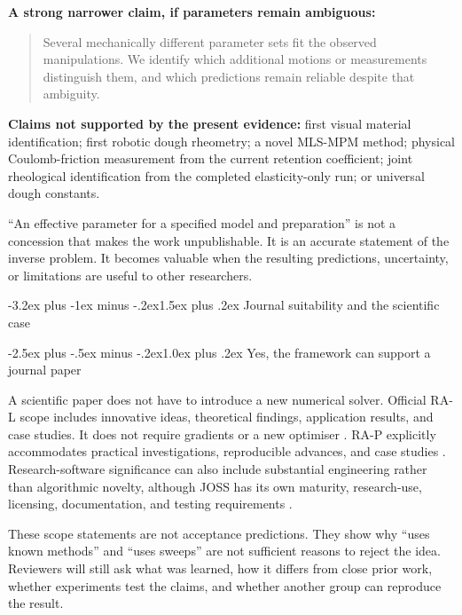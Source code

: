 \documentclass[
  11pt,
]{article}
\makeatletter
\renewcommand\section{\needspace{7\baselineskip}\@startsection{section}{1}{\z@}%
  {-3.2ex plus -1ex minus -.2ex}{1.5ex plus .2ex}%
  {\normalfont\sffamily\Large\bfseries\color{accent}}}
\renewcommand\subsection{\needspace{5\baselineskip}\@startsection{subsection}{2}{\z@}%
  {-2.5ex plus -.5ex minus -.2ex}{1.0ex plus .2ex}%
  {\normalfont\sffamily\large\bfseries\color{accent}}}
\makeatother
\begin{document}
\textbf{A strong narrower claim, if parameters remain ambiguous:}

\begin{quote}
Several mechanically different parameter sets fit the observed
manipulations. We identify which additional motions or measurements
distinguish them, and which predictions remain reliable despite that
ambiguity.
\end{quote}

\textbf{Claims not supported by the present evidence:} first visual
material identification; first robotic dough rheometry; a novel MLS-MPM
method; physical Coulomb-friction measurement from the current retention
coefficient; joint rheological identification from the completed
elasticity-only run; or universal dough constants.

``An effective parameter for a specified model and preparation'' is not
a concession that makes the work unpublishable. It is an accurate
statement of the inverse problem. It becomes valuable when the resulting
predictions, uncertainty, or limitations are useful to other
researchers.

\section{Journal suitability and the scientific
case}\label{journal-suitability-and-the-scientific-case}

\subsection{Yes, the framework can support a journal
paper}\label{yes-the-framework-can-support-a-journal-paper}

A scientific paper does not have to introduce a new numerical solver.
Official RA-L scope includes innovative ideas, theoretical findings,
application results, and case studies. It does not require gradients or
a new optimiser . RA-P explicitly
accommodates practical investigations, reproducible advances, and case
studies . Research-software
significance can also include substantial engineering rather than
algorithmic novelty, although JOSS has its own maturity, research-use,
licensing, documentation, and testing requirements
.

These scope statements are not acceptance predictions. They show why
``uses known methods'' and ``uses sweeps'' are not sufficient reasons to
reject the idea. Reviewers will still ask what was learned, how it
differs from close prior work, whether experiments test the claims, and
whether another group can reproduce the result.
\end{document}
